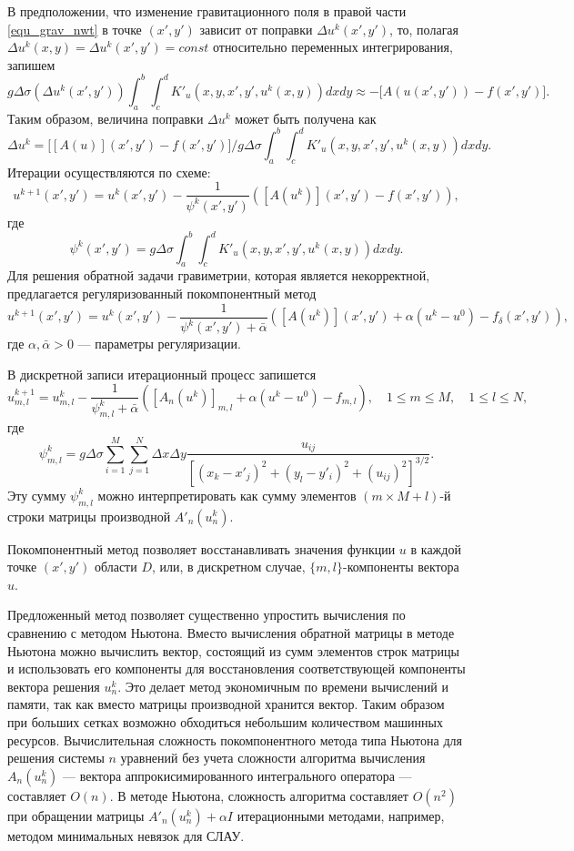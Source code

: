 В предположении, что изменение гравитационного поля в правой части \eqref{equ_grav_nwt} в точке $(x',y')$  зависит от поправки $\Delta u^k(x',y')$, то, полагая $\Delta u^k(x,y)=\Delta u^k(x',y')=const$ относительно переменных интегрирования, запишем
\begin{equation}\label{comp_newt_meth_step1}
g\Delta\sigma(\Delta u^k(x',y'))\int_{a}^{b}\int_{c}^{d}K'_u(x,y, x',y',u^k(x,y)) dxdy\approx -\big[A(u(x',y'))-f(x',y')\big].
\end{equation}
Таким образом, величина поправки $\Delta u^k$ может быть получена как
$$\Delta u^k=\bigg[[A(u)](x',y')-f(x',y')\bigg]\bigg/g\Delta\sigma\int_{a}^{b}\int_{c}^{d}K'_u(x,y, x',y',u^k(x,y)) dxdy.$$ 
Итерации осуществляются по схеме:
\begin{equation}\label{comp_newt_meth}
u^{k+1}(x',y')=u^k(x',y')-\frac{1}{\psi^k(x',y')}([A(u^k)](x',y')-f(x',y')),
\end{equation}
где $$\psi^k(x',y')=g\Delta\sigma\int_{a}^{b}\int_{c}^{d}K'_u(x,y, x',y',u^k(x,y)) dxdy.$$
Для решения обратной задачи гравиметрии, которая является некорректной, предлагается регуляризованный покомпонентный метод
\begin{equation}\label{rcomp_newt_meth}
u^{k+1}(x',y')=u^k(x',y')-\frac{1}{\psi^k(x',y')+\bar\alpha}([A(u^k)](x',y') + \alpha(u^k-u^0)-f_\delta(x',y')),
\end{equation}
где $\alpha, \bar{\alpha} > 0$ --- параметры регуляризации.

В дискретной записи итерационный процесс запишется
$$u_{m,l}^{k+1}=u_{m,l}^k-\frac{1}{\psi_{m,l}^k+\bar\alpha}([A_n(u^k)]_{m,l} + \alpha(u^k-u^0) -f_{m,l}),\quad 1\le m \le M, \quad 1\le l \le N,$$
где $$\psi_{m,l}^k=g\Delta\sigma\sum\limits_{i=1}^{M}\sum\limits_{j=1}^{N}
\Delta x\Delta y\frac{u_{ij}}{[(x_k-x'_j)^2+(y_l-y'_i)^2+(u_{ij})^2]^{3/2}}.$$
Эту сумму $\psi_{m,l}^k$ можно интерпретировать как сумму элементов $(m\times M + l)$-й строки матрицы производной $A'_n(u_n^k)$.

Покомпонентный метод позволяет восстанавливать значения функции $u$ в каждой точке $(x',y')$ области $D$, или, в дискретном случае, $\{m,l\}$-компоненты вектора $u$.

Предложенный метод позволяет существенно упростить вычисления по сравнению с методом Ньютона. Вместо вычисления обратной матрицы в методе Ньютона можно вычислить вектор, состоящий из сумм элементов строк матрицы и использовать его компоненты для восстановления соответствующей компоненты вектора решения $u_n^k$. Это делает метод экономичным по времени вычислений и памяти, так как вместо матрицы производной хранится вектор. Таким образом при больших сетках возможно обходиться небольшим количеством машинных ресурсов. Вычислительная сложность покомпонентного метода типа Ньютона для решения системы $n$ уравнений без учета сложности алгоритма вычисления $A_n(u_n^k)$ --- вектора аппрокисимированного интегрального оператора --- составляет $O(n)$. В методе Ньютона, сложность алгоритма составляет $O(n^2)$ при обращении матрицы $A'_n(u_n^k)+\alpha I$ итерационными методами, например, методом минимальных невязок для СЛАУ.

